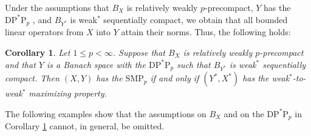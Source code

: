 \documentclass[12 pt]{article}%
\newtheorem{corollary}[theorem]{Corollary}
\newtheorem{final remark}[theorem]{Final Remark}
\newcommand {\N} {\mathbb{N}}
\newcommand{\norma}[1]{\| #1 \|}
\begin{document}
Under the assumptions that $B_X$ is relatively weakly $p$-precompact, $Y$ has the $\mathrm{DP}^*\mathrm{P}_p$ , and $B_{Y^*}$ is weak$^{*}$ sequentially compact, we obtain that all bounded linear operators from $X$ into $Y$ attain  their norms. Thus, the following holds:


\begin{corollary}\label{adj8}
Let $1\leq p<\infty$. Suppose that $B_X$ is relatively weakly $p$-precompact and that $Y$ is a Banach space with the $\mathrm{DP}^*\mathrm{P}_p$ such that $B_{Y^*}$ is weak$^{*}$ sequentially compact. Then $(X,Y)$ has the $\mathrm{SMP}_p$ if and only if $(Y^*,X^*)$ has the weak$^*$-to-weak$^*$ maximizing property.
\end{corollary}



The following examples show that the assumptions on $B_X$ and on the $\mathrm{DP}^*\mathrm{P}_p$ in Corollary \ref{adj8} cannot, in general, be omitted.
\end{document}
